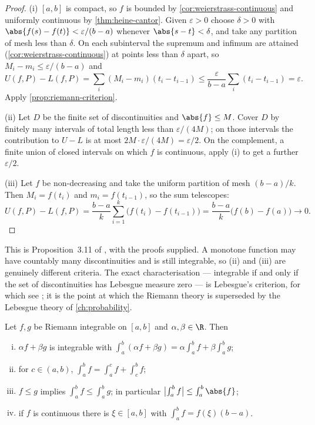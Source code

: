 \begin{proof}
	(i) $[a,b]$ is compact, so $f$ is bounded by
	\autoref{cor:weierstrass-continuous} and uniformly continuous by
	\autoref{thm:heine-cantor}. Given $\varepsilon>0$ choose $\delta>0$ with
	$\abs{f(s)-f(t)}<\varepsilon/(b-a)$ whenever $\abs{s-t}<\delta$, and take any
	partition of mesh less than $\delta$. On each subinterval the supremum and
	infimum are attained (\autoref{cor:weierstrass-continuous}) at points less than
	$\delta$ apart, so $M_i-m_i\leq\varepsilon/(b-a)$ and
	\[
		U(f,P)-L(f,P)=\sum_i(M_i-m_i)(t_i-t_{i-1})
		\leq\frac{\varepsilon}{b-a}\sum_i(t_i-t_{i-1})=\varepsilon .
	\]
	Apply \autoref{prop:riemann-criterion}.

	(ii) Let $D$ be the finite set of discontinuities and $\abs{f}\leq M$. Cover
	$D$ by finitely many intervals of total length less than
	$\varepsilon/(4M)$; on those intervals the contribution to $U-L$ is at most
	$2M\cdot\varepsilon/(4M)=\varepsilon/2$. On the complement, a finite union of
	closed intervals on which $f$ is continuous, apply (i) to get a further
	$\varepsilon/2$.

	(iii) Let $f$ be non-decreasing and take the uniform partition of mesh
	$(b-a)/k$. Then $M_i=f(t_i)$ and $m_i=f(t_{i-1})$, so the sum telescopes:
	\[
		U(f,P)-L(f,P)=\frac{b-a}{k}\sum_{i=1}^{k}\bigl(f(t_i)-f(t_{i-1})\bigr)
		=\frac{b-a}{k}\bigl(f(b)-f(a)\bigr)\longrightarrow0 .
	\]
\end{proof}

This is Proposition~3.11 of \textcite{fukuda2026notes}
\autocite[slide 66]{fukuda2026calculus}, with the proofs supplied. A monotone
function may have countably many discontinuities and is still integrable, so (ii)
and (iii) are genuinely different criteria. The exact
characterisation --- integrable if and only if the set of discontinuities has
Lebesgue measure zero --- is Lebesgue's criterion, for which see
\textcite[Thm.~11.33]{rudin1976principles}; it is the point at which the Riemann
theory is superseded by the Lebesgue theory of \autoref{ch:probability}.

\begin{proposition}\label{prop:integral-properties}
	Let $f,g$ be Riemann integrable on $[a,b]$ and $\alpha,\beta\in\R$. Then
	\begin{enumerate}[(i)]
		\item $\alpha f+\beta g$ is integrable with
		      $\int_a^b(\alpha f+\beta g)=\alpha\int_a^bf+\beta\int_a^bg$;
		\item for $c\in(a,b)$, $\int_a^bf=\int_a^cf+\int_c^bf$;
		\item $f\leq g$ implies $\int_a^bf\leq\int_a^bg$; in particular
		      $\bigl|\int_a^bf\bigr|\leq\int_a^b\abs{f}$;
		\item if $f$ is continuous there is $\xi\in[a,b]$ with
		      $\int_a^bf=f(\xi)(b-a)$.
	\end{enumerate}
\end{proposition}

